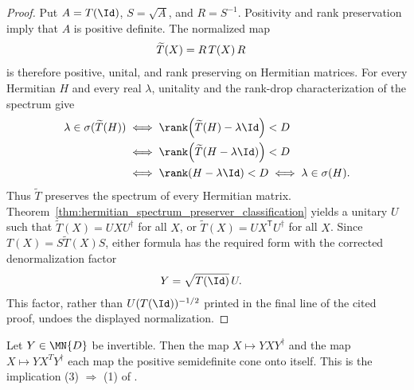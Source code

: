 \begin{proof}\leanok
    Put $A=T(\Id)$, $S=\sqrt{A}$, and $R=S^{-1}$. Positivity and rank
    preservation imply that $A$ is positive definite. The normalized map
    \begin{align}
        \widetilde T(X) & =R\,T(X)\,R
        \notag
    \end{align}
    is therefore positive, unital, and rank preserving on Hermitian matrices.
    For every Hermitian $H$ and every real $\lambda$, unitality and the
    rank-drop characterization of the spectrum give
    \begin{align}
        \lambda\in\sigma(\widetilde T(H))
        & \iff \rank\!\left(\widetilde T(H)-\lambda\Id\right)<D \\
        & \iff \rank\!\left(\widetilde T(H-\lambda\Id)\right)<D \\
        & \iff \rank(H-\lambda\Id)<D
        \iff \lambda\in\sigma(H).
        \notag
    \end{align}
    Thus $\widetilde T$ preserves the spectrum of every Hermitian matrix.
    Theorem~\ref{thm:hermitian_spectrum_preserver_classification} yields a
    unitary $U$ such that $\widetilde T(X)=UXU^\dagger$ for all $X$, or
    $\widetilde T(X)=UX^{\mathsf T}U^\dagger$ for all $X$. Since
    $T(X)=S\widetilde T(X)S$, either formula has the required form with the
    corrected denormalization factor
    \begin{align}
        Y & =\sqrt{T(\Id)}\,U.
        \notag
    \end{align}
    This factor, rather than $U(T(\Id))^{-1/2}$ printed in the final line of
    the cited proof, undoes the displayed normalization.
\end{proof}

\begin{theorem}
    \label{thm:conjugation_maps_psd_cone_onto}
    \leanok
    Let $Y\in\MN{D}$ be invertible. Then the map $X\mapsto YXY^\dagger$ and the
    map $X\mapsto YX^TY^\dagger$ each map the positive semidefinite cone onto
    itself. This is the implication (3) $\Rightarrow$ (1) of
    \cite[Proposition~3.6]{Wolf2012Quantum}.
\end{theorem}

